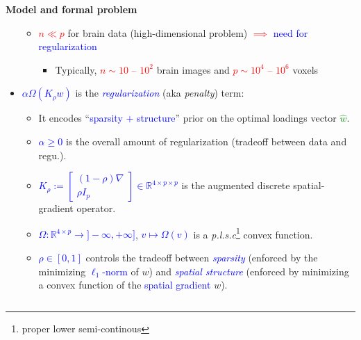 \documentclass[french]{STIC_poster}
\begin{document}
\begin{frame}[t]
\begin{columns}[t]
\begin{column}{.48\linewidth}
\begin{sxbox}[\textwidth]{\textbf{Model and formal problem}}
\begin{itemize}
\begin{itemize}
                                        \item \textcolor{red}{$n \ll p$} for brain data (high-dimensional problem) \textcolor{red}{$\implies$} \textcolor{blue}{need for regularization}
                                          \begin{itemize}
                                          \item Typically, \textcolor{red}{$n \sim 10$ -- $10^2$} brain images and \textcolor{red}{$p \sim 10^4$ -- $10^6$} voxels
                                          \end{itemize}
                                      \end{itemize}
                                    \item \textcolor{blue}{$\alpha \Omega(K_{\rho}w)$} is the \textcolor{blue}{\textit{regularization}} (aka \textit{penalty}) term:
                                    \begin{itemize}
                                      \item It encodes ``\textcolor{blue}{sparsity + structure}'' prior on the optimal loadings vector \textcolor{green}{$\hat{w}$}.
                                      \item \textcolor{blue}{$\alpha \ge 0$} is the overall amount of regularization (tradeoff between data and regu.).
                                      \item \textcolor{blue}{$K_{\rho} := \begin{bmatrix}(1-\rho)\nabla \\ \rho I_p\end{bmatrix} \in \mathbb{R}^{4 \times p \times p}$}
                                        is the augmented discrete spatial-gradient operator.
                                      \item \textcolor{blue}{$\Omega: \mathbb{R}^{4 \times p} \rightarrow ]-\infty,+\infty]$}, \textcolor{blue}{$v \mapsto \Omega(v)$}
                                          is a \textit{p.l.s.c}\footnote{proper lower semi-continous} convex function.
                                        \item \textcolor{blue}{$\rho \in [0, 1]$} controls the tradeoff between \textcolor{blue}{\textit{sparsity}}
                                          (enforced by the minimizing \textcolor{blue}{$\ell_1$-norm} of $w$) and
                                          \textcolor{blue}{\textit{spatial structure}} (enforced by minimizing a convex function of the \textcolor{blue}{spatial gradient} $w$).

\end{itemize}
\end{itemize}
\end{sxbox}
\end{column}
\end{columns}
\end{frame}
\end{document}

